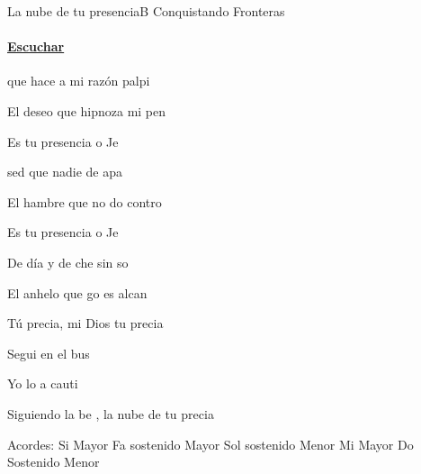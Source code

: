 \documentclass[12pt, spanish]{book}
\begin{document}
    \begin{song}{La nube de tu presencia}{B}
    {} %
    {Conquistando Fronteras}
    {} %
    {}
        \ifChordBk
            \paragraph{\mbox{}\hfill\protect\href{https://open.spotify.com/intl-es/track/3QFeP49kd51QwPWMrVnWQQ}{Escuchar}\mbox{}\hfill}
        \fi


        \begin{SBOpGroup}
             que hace a mi razón palpi

            El deseo que hipnoza mi pen

            Es tu presencia o Je
        \end{SBOpGroup}

        \begin{SBOpGroup}
             sed que nadie de apa

            El hambre que no do contro

            Es tu presencia o Je
        \end{SBOpGroup}

        \begin{SBChorus}
            De día y de che sin so

            El anhelo que go es alcan

            Tú precia, mi Dios tu precia
        \end{SBChorus}

        \begin{SBOpGroup}
            Segui en el bus

            Yo lo  a cauti

            Siguiendo la be , la nube de tu precia
        \end{SBOpGroup}

        \ifChordBk
        \begin{SBOpGroup}
            Acordes:\break
            \upchord{\B}\qquad\qquad Si Mayor \hfill
            \upchord{\Fs}Fa sostenido Mayor \hfill\null\break
            \upchord{\Gsm}\qquad Sol sostenido Menor \hfill
            \upchord{\E}\qquad Mi Mayor \hfill\null\break
            \upchord{\Csm}\qquad Do Sostenido Menor \hfill\null\break
        \end{SBOpGroup}
        \fi


\end{song}
\end{document}
